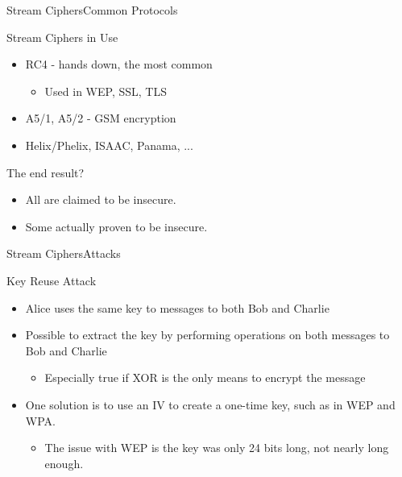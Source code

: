 \documentclass[12pt]{beamer}
\begin{document}
\begin{frame}{Stream Ciphers}{Common Protocols}
\begin{block}{Stream Ciphers in Use}
\begin{itemize}
	\item RC4 - hands down, the most common
	\begin{itemize}
		\item Used in WEP, SSL, TLS
	\end{itemize}
	\item A5/1, A5/2 - GSM encryption
	\item Helix/Phelix, ISAAC, Panama, ...
\end{itemize}
\end{block}
\begin{block}{The end result?}
\begin{itemize}
	\item All are claimed to be insecure.
	\item Some actually proven to be insecure.
\end{itemize}
\end{block}
\end{frame}

\begin{frame}{Stream Ciphers}{Attacks}
\begin{block}{Key Reuse Attack}
\begin{itemize}
	\item Alice uses the same key to messages to both Bob and Charlie
	\item Possible to extract the key by performing operations on both messages to Bob and Charlie
	\begin{itemize}
		\item Especially true if XOR is the only means to encrypt the message
	\end{itemize}
	\item One solution is to use an IV to create a one-time key, such as in WEP and WPA.
	\begin{itemize}
		\item The issue with WEP is the key was only 24 bits long, not nearly long enough.
	\end{itemize}
\end{itemize}
\end{block}
\end{frame}
\end{document}
